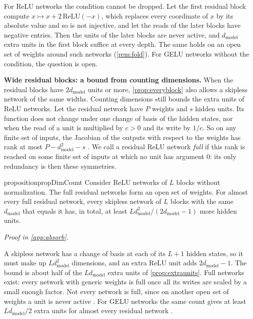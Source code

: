 \documentclass[10pt]{article}
\theoremstyle{definition}
\theoremstyle{remark}
\newcommand{\dm}{d_{\mathrm{model}}}
\newcommand{\para}[1]{\smallskip\noindent\textbf{#1}\hspace{0.5em}}
\newcommand{\proofin}[1]{\par\vspace{-0.4\baselineskip}\noindent\hfill{\small\itshape Proof in \cref{#1}.}\par\smallskip}
\begin{document}
For ReLU networks the condition cannot be dropped. Let the first residual block compute $x \mapsto x + 2\,\mathrm{ReLU}(-x)$, which replaces every coordinate of $x$ by its absolute value and so is not injective, and let the reads of the later blocks have negative entries. Then the units of the later blocks are never active, and $\dm$ extra units in the first block suffice at every depth. The same holds on an open set of weights around such networks (\cref{rem:fold}). For GELU networks without the condition, the question is open.

\para{Wide residual blocks: a bound from counting dimensions.} When the residual blocks have $2\dm$ units or more, \cref{prop:everyblock} also allows a skipless network of the same widths. Counting dimensions still bounds the extra units of ReLU networks. Let the residual network have $P$ weights and $s$ hidden units. Its function does not change under one change of basis of the hidden states, nor when the read of a unit is multiplied by $c > 0$ and its write by $1/c$. So on any finite set of inputs, the Jacobian of the outputs with respect to the weights has rank at most $P - \dm^2 - s$ \citep{karbevski2026unlock}. We call a residual ReLU network \emph{full} if this rank is reached on some finite set of inputs at which no unit has argument $0$: its only redundancy is then these symmetries.

\begin{restatable}{proposition}{propDimCount}\label{prop:dimcount}
Consider ReLU networks of $L$ blocks without normalization. The full residual networks form an open set of weights. For almost every full residual network, every skipless network of $L$ blocks with the same $\dm$ that equals it has, in total, at least $L\dm^2/(2\dm - 1)$ more hidden units.
\end{restatable}
\proofin{app:absorb}

A skipless network has a change of basis at each of its $L + 1$ hidden states, so it must make up $L\dm^2$ dimensions, and an extra ReLU unit adds $2\dm - 1$. The bound is about half of the $L\dm$ extra units of \cref{prop:extraunits}. Full networks exist: every network with generic weights is full once all its writes are scaled by a small enough factor. Not every network is full, since on another open set of weights a unit is never active \citep{karbevski2026unlock}. For GELU networks the same count gives at least $L\dm/2$ extra units for almost every residual network \citep{karbevski2026unlock}.
\end{document}
